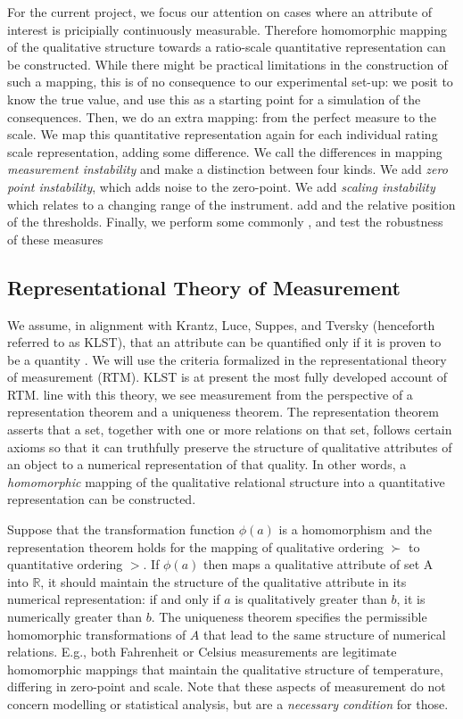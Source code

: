 \documentclass[utf8]{FrontiersinVancouver}
\begin{document}
For the current project, we focus our attention on cases where an attribute of interest is pricipially continuously measurable. Therefore homomorphic mapping of the qualitative structure towards a ratio-scale quantitative representation can be constructed. While there might be practical limitations in the construction of such a mapping, this is of no consequence to our experimental set-up: we posit to know the true value, and use this as a starting point for a simulation of the consequences. Then, we do an extra mapping: from the perfect measure to the scale. We map this quantitative representation again for each individual rating scale representation, adding some difference. We call the differences in mapping \textit{measurement instability} and make a distinction between four kinds. We add \textit{zero point instability}, which adds noise to the zero-point. We add \textit{scaling instability} which relates to a changing range of the instrument. add  and the relative position of the thresholds. Finally, we perform some commonly , and test the robustness of these measures

\subsection{Representational Theory of Measurement}
We assume, in alignment with Krantz, Luce, Suppes, and Tversky (henceforth referred to as KLST), that an attribute can be quantified only if it is proven to be a quantity \citep{}. We will use the criteria formalized in the representational theory of measurement (RTM). KLST is at present the most fully developed account of RTM. \@In line with this theory, we see measurement from the perspective of a representation theorem and a uniqueness theorem. The representation theorem asserts that a set, together with one or more relations on that set, follows certain axioms so that it can truthfully preserve the structure of qualitative attributes of an object to a numerical representation of that quality. In other words, a \textit{homomorphic} mapping of the qualitative relational structure into a quantitative representation can be constructed. 

Suppose that the transformation function $\phi(a)$ is a homomorphism and the representation theorem holds for the mapping of qualitative ordering $\succ$ to quantitative ordering $>$. If $\phi(a)$ then maps a qualitative attribute of set A into $\mathbb{R}$, it should maintain the structure of the qualitative attribute in its numerical representation: if and only if $a$ is qualitatively greater than $b$, it is numerically greater than $b$. The uniqueness theorem specifies the permissible homomorphic transformations of $A$ that lead to the same structure of numerical relations. E.g., both Fahrenheit or Celsius measurements are legitimate homomorphic mappings that maintain the qualitative structure of temperature, differing in zero-point and scale. Note that these aspects of measurement do not concern modelling or statistical analysis, but are a \textit{necessary condition} for those.
\end{document}
